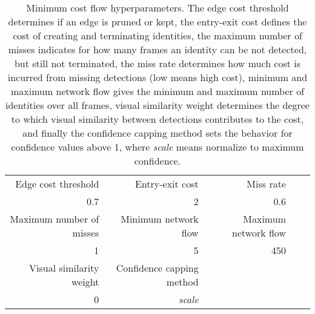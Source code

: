\begin{table*}[h]
    \begin{adjustbox}{max width=\textwidth,center}
        \begin{tabular}{@{}rrrrr@{}}
            \toprule
            Edge cost threshold      & Entry-exit cost           & Miss rate            &  &  \\
            0.7                      & 2                         & 0.6                  &  &  \vspace{5mm} \\
            \toprule
            Maximum number of misses & Minimum network flow      & Maximum network flow &  &  \\ 
            1                        & 5                         & 450                  &  &  \vspace{5mm} \\
            \toprule
            Visual similarity weight & Confidence capping method &                      &  &  \\
            0                        & \textit{scale}            &                      &  & \\
        \end{tabular}
    \end{adjustbox}
\caption[Minimum cost flow hyperparameters]
    {Minimum cost flow hyperparameters. The edge cost threshold determines if an
    edge is pruned or kept, the entry-exit cost defines the cost of creating and
    terminating identities, the maximum number of misses indicates for how many
    frames an identity can be not detected, but still not terminated, the miss
    rate determines how much cost is incurred from missing detections (low means
    high cost), minimum and maximum network flow gives the minimum and maximum
    number of identities over all frames, visual similarity weight determines
    the degree to which visual similarity between detections contributes to the
    cost, and finally the confidence capping method sets the behavior for
    confidence values above 1, where \textit{scale} means normalize to maximum
    confidence.}
\label{MCF_params}
\end{table*}

